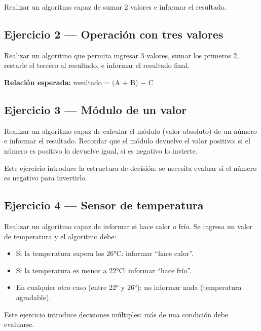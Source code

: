 Realizar un algoritmo capaz de sumar 2 valores e informar el resultado.

\subsection{Ejercicio 2 --- Operación con tres valores}

Realizar un algoritmo que permita ingresar 3 valores, sumar los primeros 2, restarle el tercero al resultado, e informar el resultado final.

\textbf{Relación esperada:} resultado = (A + B) $-$ C

\subsection{Ejercicio 3 --- Módulo de un valor}

Realizar un algoritmo capaz de calcular el módulo (valor absoluto) de un número e informar el resultado. Recordar que el módulo devuelve el valor positivo: si el número es positivo lo devuelve igual, si es negativo lo invierte.

\begin{advertenciabox}
Este ejercicio introduce la estructura de decisión: se necesita evaluar si el número es negativo para invertirlo.
\end{advertenciabox}

\subsection{Ejercicio 4 --- Sensor de temperatura}

Realizar un algoritmo capaz de informar si hace calor o frío. Se ingresa un valor de temperatura y el algoritmo debe:

\begin{itemize}
    \item Si la temperatura supera los 26°C: informar ``hace calor''.
    \item Si la temperatura es menor a 22°C: informar ``hace frío''.
    \item En cualquier otro caso (entre 22° y 26°): no informar nada (temperatura agradable).
\end{itemize}

\begin{advertenciabox}
Este ejercicio introduce decisiones múltiples: más de una condición debe evaluarse.
\end{advertenciabox}

